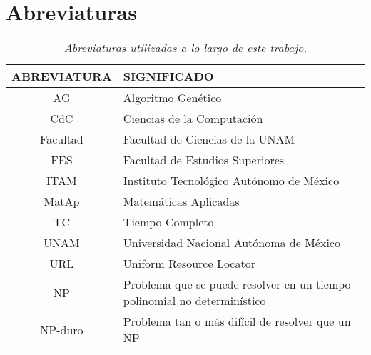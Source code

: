\section{Abreviaturas}

\begin{table}[H]
\centering
\begin{tabular}{|c|p{10cm}|}
\hline 
 \textbf{ABREVIATURA} & \textbf{SIGNIFICADO} \\ 
\hline 
 AG & Algoritmo Genético \\ 
\hline 
 CdC & Ciencias de la Computación \\ 
\hline 
 Facultad & Facultad de Ciencias de la UNAM \\ 
\hline 
 FES & Facultad de Estudios Superiores \\
\hline 
 ITAM & Instituto Tecnológico Autónomo de México \\ 
\hline 
 MatAp & Matemáticas Aplicadas \\ 
\hline 
 TC & Tiempo Completo \\ 
\hline 
 UNAM & Universidad Nacional Autónoma de México \\ 
\hline 
 URL & Uniform Resource Locator \\ 
\hline 
 NP & Problema que se puede resolver en un tiempo polinomial no determinístico \\ %
\hline 
 NP-duro & Problema tan o más difícil de resolver que un NP \\ %
\hline 
\end{tabular} 
\caption[\textit{Abreviaturas}]{\textit{Abreviaturas utilizadas a lo largo de este trabajo.}}
\end{table}
